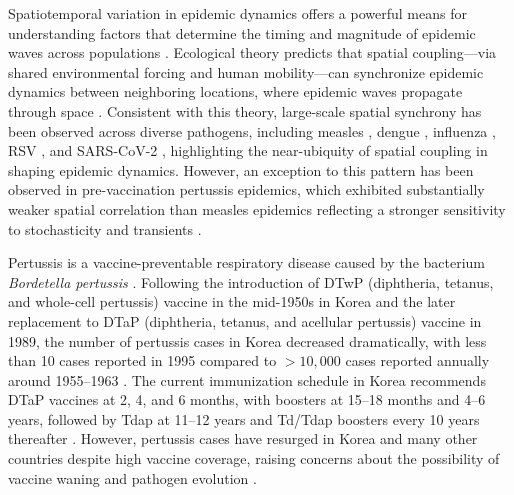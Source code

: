 \documentclass[12pt]{article}
\begin{document}
Spatiotemporal variation in epidemic dynamics offers a powerful means for understanding factors that determine the timing and magnitude of epidemic waves across populations \citep{pitzer2015environmental,dalziel2018urbanization,pons2018seasonality,baker2019epidemic}.
Ecological theory predicts that spatial coupling---via shared environmental forcing and human mobility---can synchronize epidemic dynamics between neighboring locations, where epidemic waves propagate through space \citep{hassell1991spatial,sherratt2001periodic,grenfell2001travelling}.
Consistent with this theory, large-scale spatial synchrony has been observed across diverse pathogens, including measles \citep{grenfell2001travelling}, dengue \citep{cummings2004travelling}, influenza \citep{viboud2006synchrony}, RSV \citep{baker2019epidemic}, and SARS-CoV-2 \citep{paton2022rapid}, highlighting the near-ubiquity of spatial coupling in shaping epidemic dynamics.
However, an exception to this pattern has been observed in pre-vaccination pertussis epidemics, which exhibited substantially weaker spatial correlation than measles epidemics reflecting a stronger sensitivity to stochasticity and transients \citep{rohani1999opposite}.

Pertussis is a vaccine-preventable respiratory disease caused by the bacterium \textit{Bordetella pertussis} \citep{kilgore2016pertussis}.
Following the introduction of DTwP (diphtheria, tetanus, and whole-cell pertussis) vaccine in the mid-1950s in Korea and the later replacement to DTaP (diphtheria, tetanus, and acellular pertussis) vaccine in 1989, the number of pertussis cases in Korea decreased dramatically, with less than 10 cases reported in 1995 compared to $>10,000$ cases reported annually around 1955--1963 \citep{lee2008immunization,choi2010immunogenicity,choe2012national,oh2012milestones,choe2013comparative}.
The current immunization schedule in Korea recommends DTaP vaccines at 2, 4, and 6 months, with boosters at 15–18 months and 4–6 years, followed by Tdap at 11–12 years and Td/Tdap boosters every 10 years thereafter \citep{KDCA2025Diphtheria}.
However, pertussis cases have resurged in Korea and many other countries despite high vaccine coverage, raising concerns about the possibility of vaccine waning \citep{cherry2005epidemiology,wearing2009estimating} and pathogen evolution \citep{mooi2001adaptation,barkoff2018surveillance,lesne2020acellular}.
\end{document}
